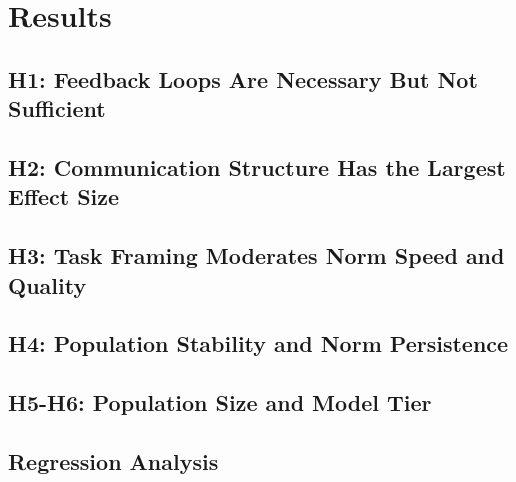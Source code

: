 \section{Results}
\label{sec:results}

\subsection{H1: Feedback Loops Are Necessary But Not Sufficient}


\subsection{H2: Communication Structure Has the Largest Effect Size}


\subsection{H3: Task Framing Moderates Norm Speed and Quality}


\subsection{H4: Population Stability and Norm Persistence}


\subsection{H5-H6: Population Size and Model Tier}


\subsection{Regression Analysis}

